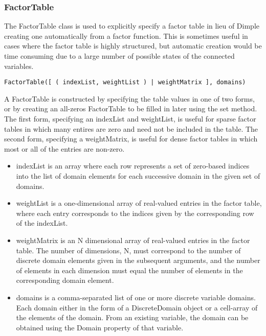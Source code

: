 \fi

\subsubsection{FactorTable}
\label{sec:FactorTable}

The FactorTable class is used to explicitly specify a factor table in lieu of Dimple creating one automatically from a factor function.  This is sometimes useful in cases where the factor table is highly structured, but automatic creation would be time consuming due to a large number of possible states of the connected variables.


\ifmatlab
\begin{lstlisting}
FactorTable([ ( indexList, weightList ) | weightMatrix ], domains)
\end{lstlisting}

A FactorTable is constructed by specifying the table values in one of two forms, or by creating an all-zeros FactorTable to be filled in later using the set method.  The first form, specifying an indexList and weightList, is useful for sparse factor tables in which many entires are zero and need not be included in the table.  The second form, specifying a weightMatrix, is useful for dense factor tables in which most or all of the entries are non-zero.


\begin{itemize}
\item indexList is an array where each row represents a set of zero-based indices into the list of domain elements for each successive domain in the given set of domains.
\item weightList is a one-dimensional array of real-valued entries in the factor table, where each entry corresponds to the indices given by the corresponding row of the indexList.
\item weightMatrix is an N dimensional array of real-valued entries in the factor table.  The number of dimensions, N, must correspond to the number of discrete domain elements given in the subsequent arguments, and the number of elements in each dimension must equal the number of elements in the corresponding domain element.
\item domains is a comma-separated list of one or more discrete variable domains.  Each domain either in the form of a DiscreteDomain object or a cell-array of the elements of the domain.  From an existing variable, the domain can be obtained using the Domain property of that variable.
\end{itemize}

